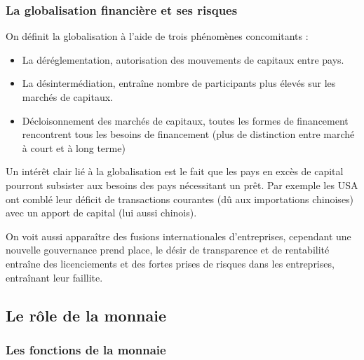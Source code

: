 
\subsubsection{La globalisation financière et ses risques} %
\label{sub:la_globalisation_financiere_et_ses_risques}

On définit la globalisation à l'aide de trois phénomènes concomitants : 
\begin{itemize}[label=]
	\item La déréglementation, autorisation des mouvements de capitaux entre pays.
	\item La désintermédiation, entraîne nombre de participants plus élevés sur les marchés de capitaux.
	\item Décloisonnement des marchés de capitaux, toutes les formes de financement rencontrent tous les besoins de financement (plus de distinction entre
	marché à court et à long terme) 
\end{itemize}

Un intérêt clair lié à la globalisation est le fait que les pays en excès de capital pourront subsister aux besoins des pays nécessitant un prêt. Par 
exemple les USA ont comblé leur déficit de transactions courantes (dû aux importations chinoises) avec un apport de capital (lui aussi chinois).

On voit aussi apparaître des fusions internationales d'entreprises, cependant une nouvelle gouvernance prend place, le désir de transparence et de rentabilité entraîne des licenciements et des fortes prises de risques dans les entreprises, entraînant leur faillite.




\subsection{Le rôle de la monnaie} %
\label{sec:le_role_de_la_monnaie}

\subsubsection{Les fonctions de la monnaie} %
\label{sub:les_fonctions_de_la_monnaie}

